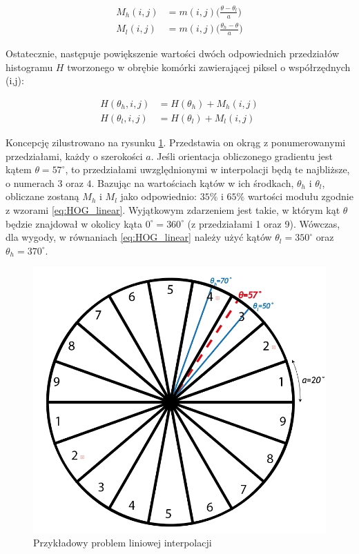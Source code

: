 \begin{equation}
\label{eq:HOG_linear}
\left.\begin{aligned}
M_h(i,j)&=m(i,j)\bigg(\frac{\theta-\theta_l}{a}\bigg)\\
M_l(i,j)&=m(i,j)\bigg(\frac{\theta_h-\theta}{a}\bigg)
\end{aligned}\right.
\end{equation}

Ostatecznie, następuje powiększenie wartości dwóch odpowiednich przedziałów histogramu $H$ tworzonego w obrębie komórki zawierającej piksel o współrzędnych (i,j):

\begin{equation}
\label{eq:HOG_increment}
\left.\begin{aligned} 
H(\theta_h,i,j)&=H(\theta_h)+M_h(i,j) \\ 
H(\theta_l,i,j)&=H(\theta_l)+M_l(i,j)
\end{aligned}\right.
\end{equation}

Koncepcję zilustrowano na rysunku \ref{fig:HOG_interpolation}.  %
Przedstawia on okrąg z ponumerowanymi przedziałami, każdy o szerokości $a$. Jeśli orientacja obliczonego gradientu jest kątem $\theta=57^{\circ}$, to przedziałami uwzględnionymi w interpolacji będą te najbliższe, o numerach $3$ oraz $4$. Bazując na wartościach kątów w ich środkach, $\theta_h$ i $\theta_l$, obliczane zostaną $M_h$ i $M_l$ jako odpowiednio: $35\%$ i $65\%$ wartości modułu zgodnie z wzorami \eqref{eq:HOG_linear}.
Wyjątkowym zdarzeniem jest takie, w którym kąt $\theta$ będzie znajdował w okolicy kąta $0^{\circ}=360^{\circ}$ (z przedziałami 1 oraz 9). 
Wówczas, dla wygody, w równaniach \eqref{eq:HOG_linear} należy użyć kątów $\theta_l=350^{\circ}$ oraz $\theta_h=370^{\circ}$.

\begin{figure}[h]
	\centering
	\hspace*{1cm}
	\includegraphics[width=12cm]{2_HOG_interpolation.jpg}
	\caption{Przykładowy problem liniowej interpolacji}
	\label{fig:HOG_interpolation}
\end{figure}

